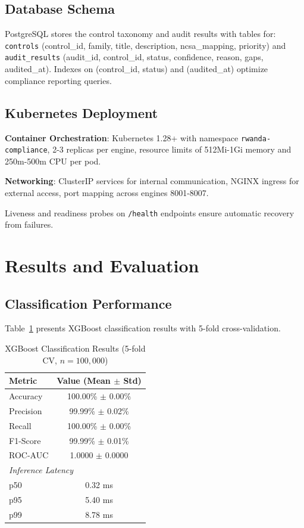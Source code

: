 \documentclass[11pt,conference]{IEEEtran}
\begin{document}
\subsection{Database Schema}

PostgreSQL stores the control taxonomy and audit results with tables for: \texttt{controls} (control\_id, family, title, description, ncsa\_mapping, priority) and \texttt{audit\_results} (audit\_id, control\_id, status, confidence, reason, gaps, audited\_at). Indexes on (control\_id, status) and (audited\_at) optimize compliance reporting queries.

\subsection{Kubernetes Deployment}

\textbf{Container Orchestration}: Kubernetes 1.28+ with namespace \texttt{rwanda-compliance}, 2-3 replicas per engine, resource limits of 512Mi-1Gi memory and 250m-500m CPU per pod.

\textbf{Networking}: ClusterIP services for internal communication, NGINX ingress for external access, port mapping across engines 8001-8007.

Liveness and readiness probes on \texttt{/health} endpoints ensure automatic recovery from failures.

\section{Results and Evaluation}

\subsection{Classification Performance}

Table~\ref{tab:results} presents XGBoost classification results with 5-fold cross-validation.

\begin{table}[!t]
\centering
\caption{XGBoost Classification Results (5-fold CV, $n=100,000$)}
\label{tab:results}
\begin{tabular}{@{}lc@{}}
\toprule
\textbf{Metric} & \textbf{Value (Mean $\pm$ Std)} \\
\midrule
Accuracy & 100.00\% $\pm$ 0.00\% \\
Precision & 99.99\% $\pm$ 0.02\% \\
Recall & 100.00\% $\pm$ 0.00\% \\
F1-Score & 99.99\% $\pm$ 0.01\% \\
ROC-AUC & 1.0000 $\pm$ 0.0000 \\
\midrule
\multicolumn{2}{l}{\textit{Inference Latency}} \\
p50 & 0.32 ms \\
p95 & 5.40 ms \\
p99 & 8.78 ms \\
\bottomrule
\end{tabular}
\end{table}
\end{document}
